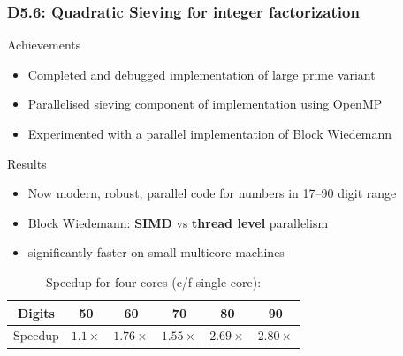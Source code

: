 \documentclass{beamer}
\begin{document}
\begin{frame}
  \frametitle{D5.6: Quadratic Sieving for integer factorization}
    \begin{block}{Achievements}
      \begin{itemize}
      \item Completed and debugged implementation of large prime variant
      \item Parallelised sieving component of implementation using OpenMP 
      \item Experimented with a parallel implementation of Block Wiedemann
      \end{itemize}
\end{block}
\begin{block}{Results}

      \begin{itemize}
      \item Now modern, robust, parallel code for numbers in
        17--90 digit range
      \item Block Wiedemann:  \textbf{SIMD} vs \textbf{thread level}
        parallelism       \pause
      \item significantly faster on small multicore machines
      \end{itemize}
      \begin{center}
        \begin{table}
          \caption{Speedup for four cores (c/f single core): }
        \begin{tabular}{c|ccccc}
        \toprule
            {Digits} & 50 & 60 & 70 & 80 & 90\\
            \midrule
                {Speedup} & $1.1\times$ & $1.76\times$ & $1.55\times$ & $2.69\times$ & $2.80\times$\\
                \bottomrule
      \end{tabular}
\end{table}
      \end{center}
    \end{block}
    
\end{frame}
\end{document}
